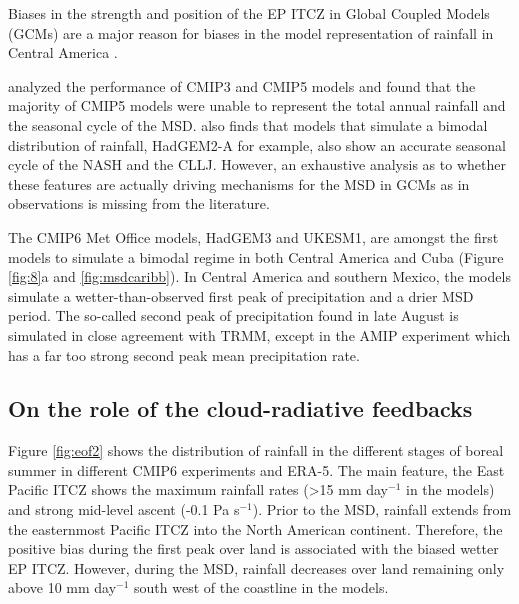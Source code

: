 Biases in the strength and position of the EP ITCZ in Global Coupled Models (GCMs) \citep{bellucci2010,li2014,schneider2014} are a major reason for biases in the model representation of rainfall in Central America  \citep{rauscher2008}. 

\cite{ryu2014} analyzed the performance of CMIP3 and CMIP5 models and found that the majority of CMIP5 models were unable to represent the total annual rainfall and the seasonal cycle of the MSD. \cite{ryu2014} also finds that models that simulate a bimodal distribution of rainfall, HadGEM2-A for example, also show an accurate seasonal cycle of the NASH and the CLLJ. However, an exhaustive analysis as to whether these features are actually driving mechanisms for the MSD in GCMs as in observations is missing from the literature. 


The CMIP6 Met Office models, HadGEM3 and UKESM1, are amongst the first models to simulate a bimodal regime in both Central America and Cuba (Figure \ref{fig:8}a and \ref{fig:msdcaribb}). 
In Central America and southern Mexico, the models simulate a wetter-than-observed first peak of precipitation and a drier MSD period.
% 
The so-called second peak of precipitation found in late August is simulated in close agreement with TRMM, except in the AMIP experiment which has a far too strong second peak mean precipitation rate.

\subsection{On the role of the cloud-radiative feedbacks}

Figure \ref{fig:eof2} shows the distribution of rainfall in the different stages of boreal summer in different CMIP6 experiments and ERA-5. 
The main feature, the East Pacific ITCZ shows the maximum rainfall rates (>15 mm day$^{-1}$ in the models) and strong mid-level ascent (-0.1 Pa s$^{-1}$). Prior to the MSD, rainfall extends from the easternmost Pacific ITCZ into the North American continent. Therefore, the positive bias during the first peak over land is associated with the biased wetter EP ITCZ.  However, during the MSD, rainfall decreases over land remaining only above 10 mm day$^{-1}$ south west of the coastline in the models.




